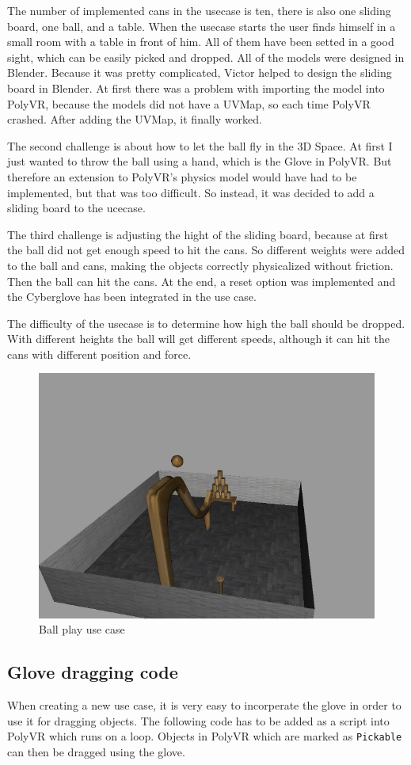 The number of implemented cans in the usecase is ten, there is also one sliding board, one ball, and a table. When the usecase starts the user finds himself in a small room with a table in front of him. All of them have been setted in a good sight, which can be easily picked and dropped. All of the models were designed in Blender. Because it was pretty complicated, Victor helped to design the sliding board in Blender. At first there was a problem with importing the model into PolyVR, because the models did not have a UVMap, so each time PolyVR crashed. After adding the UVMap, it finally worked. 

The second challenge is about how to let the ball fly in the 3D Space. At first I just wanted to throw the ball using a hand, which is the Glove in PolyVR. But therefore an extension to PolyVR's physics model would have had to be implemented, but that was too difficult. So instead, it was decided to add a sliding board to the ucecase. 

The third challenge is adjusting the hight of the sliding board, because at first the ball did not get enough speed to hit the cans. So different weights were added to the ball and cans, making the objects correctly physicalized without friction. Then the ball can hit the cans. At the end, a reset option was implemented and the Cyberglove has been integrated in the use case.

The difficulty of the usecase is to determine how high the ball should be dropped. With different heights the ball will get different speeds, although it can hit the cans with different position and force.

\begin{figure}[!h]
	\centering
	\includegraphics[width=.7\textwidth]{./images/ballplay.png}
	\caption{Ball play use case}
	\label{ballplay}
\end{figure}

\subsection{Glove dragging code}

When creating a new use case, it is very easy to incorperate the glove in order to use it for dragging objects. The following code has to be added as a script into PolyVR which runs on a loop. Objects in PolyVR which are marked as \texttt{Pickable} can then be dragged using the glove.

